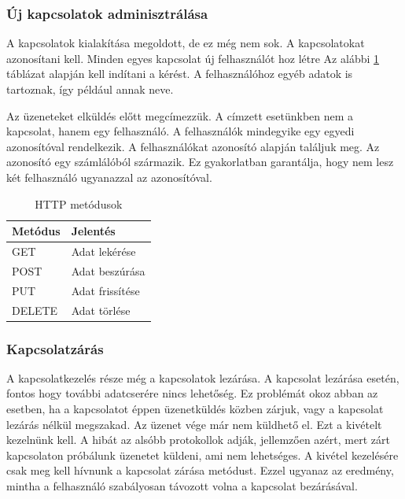 \documentclass[bibliography=totocnumbered]{article}
\begin{document}
\subsubsection{Új kapcsolatok
adminisztrálása}

A kapcsolatok kialakítása megoldott, de ez még nem sok. A kapcsolatokat
azonosítani kell. Minden egyes kapcsolat új felhasználót hoz létre Az alábbi 
\ref{methods} táblázat alapján kell indítani a kérést. A
felhasználóhoz egyéb adatok is tartoznak, így például annak neve.

Az üzeneteket elküldés előtt megcímezzük. A címzett esetünkben nem a
kapcsolat, hanem egy felhasználó. A felhasználók mindegyike egy egyedi
azonosítóval rendelkezik. A felhasználókat azonosító alapján találjuk
meg. Az azonosító egy számlálóból származik. Ez gyakorlatban garantálja,
hogy nem lesz két felhasználó ugyanazzal az azonosítóval.

\begin{table}[ht]
	\centering
	\caption{HTTP metódusok}
	\label{methods}
	\begin{tabular}{|l|l|}
		\hline
		\rowcolor[HTML]{9B9B9B} 
		{\color[HTML]{000000} Metódus} & {\color[HTML]{000000} Jelentés} \\ \hline
		GET                            & Adat lekérése                   \\ \hline
		POST                           & Adat beszúrása                  \\ \hline
		PUT                            & Adat frissítése                 \\ \hline
		DELETE                         & Adat törlése                    \\ \hline
	\end{tabular}
\end{table}

\subsubsection{Kapcsolatzárás}

A kapcsolatkezelés része még a kapcsolatok lezárása. A kapcsolat
lezárása esetén, fontos hogy további adatcserére nincs lehetőség. Ez
problémát okoz abban az esetben, ha a kapcsolatot éppen üzenetküldés
közben zárjuk, vagy a kapcsolat lezárás nélkül megszakad. Az üzenet vége
már nem küldhető el. Ezt a kivételt kezelnünk kell. A hibát az alsóbb
protokollok adják, jellemzően azért, mert zárt kapcsolaton próbálunk
üzenetet küldeni, ami nem lehetséges. A kivétel kezelésére csak meg kell
hívnunk a kapcsolat zárása metódust. Ezzel ugyanaz az eredmény, mintha a
felhasználó szabályosan távozott volna a kapcsolat bezárásával.
\end{document}
